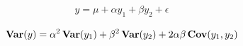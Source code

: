 \documentclass[12pt]{article}
\begin{document}
\pagestyle{empty}
\Large
{}
\pagecolor{ehandbook}


\boldmath 

\begin{eqnarray*}
y = \mu + \alpha y_1 + \beta y_2 + \epsilon
\end{eqnarray*}

\begin{eqnarray*}
\mbox{\bf Var}(y) = \alpha^2 \, \mbox{\bf Var}(y_1) +  \beta^2 \, \mbox{\bf Var}(y_2) + 2 \alpha \beta \, \mbox{\bf Cov}(y_1, y_2) 
\end{eqnarray*}
\end{document}

